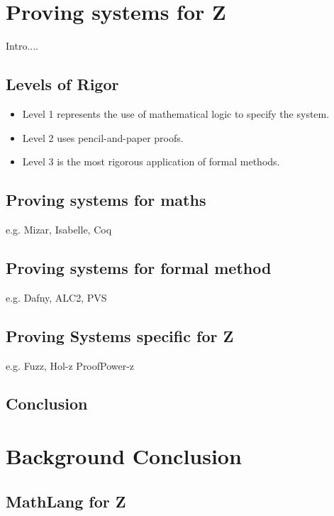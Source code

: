 \section{Proving systems for Z}

Intro....

\subsection{Levels of Rigor}

\begin{itemize}
\item Level 1 represents the use of mathematical logic to specify the system.
\item Level 2 uses pencil-and-paper proofs.
\item Level 3 is the most rigorous application of formal methods.

\end{itemize}

\subsection{Proving systems for maths}

e.g. Mizar, Isabelle, Coq

\subsection{Proving systems for formal method}

e.g. Dafny, ALC2, PVS

\subsection{Proving Systems specific for Z}

e.g. Fuzz, Hol-z ProofPower-z

\subsection{Conclusion}

\section{Background Conclusion}

\subsection{MathLang for Z}

